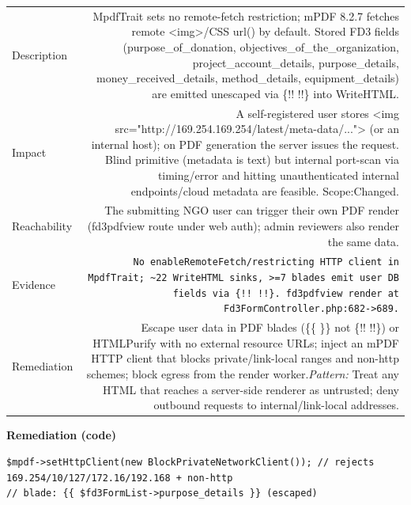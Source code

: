 \documentclass[11pt,a4paper]{article}
\begin{document}
{\renewcommand{\arraystretch}{1.35}%
\begin{tabularx}{\textwidth}{L R}
\toprule
Description & MpdfTrait sets no remote-fetch restriction; mPDF 8.2.7 fetches remote \textless{}img\textgreater{}/CSS url() by default. Stored FD3 fields (purpose\_of\_donation, objectives\_of\_the\_organization, project\_account\_details, purpose\_details, money\_received\_details, method\_details, equipment\_details) are emitted unescaped via \{!! !!\} into WriteHTML. \\
Impact & A self-registered user stores \textless{}img src="http://169.254.169.254/latest/meta-data/..."\textgreater{} (or an internal host); on PDF generation the server issues the request. Blind primitive (metadata is text) but internal port-scan via timing/error and hitting unauthenticated internal endpoints/cloud metadata are feasible. Scope:Changed. \\
Reachability & The submitting NGO user can trigger their own PDF render (fd3pdfview route under web auth); admin reviewers also render the same data. \\
Evidence & \texttt{\small No enableRemoteFetch/restricting HTTP client in MpdfTrait; \textasciitilde{}22 WriteHTML sinks, \textgreater{}=7 blades emit user DB fields via \{!! !!\}. fd3pdfview render at Fd3FormController.php:682-\textgreater{}689.} \\
Remediation & Escape user data in PDF blades (\{\{ \}\} not \{!! !!\}) or HTMLPurify with no external resource URLs; inject an mPDF HTTP client that blocks private/link-local ranges and non-http schemes; block egress from the render worker.\newline\emph{Pattern:} Treat any HTML that reaches a server-side renderer as untrusted; deny outbound requests to internal/link-local addresses. \\
\bottomrule
\end{tabularx}}

\vspace{4pt}\noindent\textbf{Remediation (code)}\par
\begin{lstlisting}
$mpdf->setHttpClient(new BlockPrivateNetworkClient()); // rejects 169.254/10/127/172.16/192.168 + non-http
// blade: {{ $fd3FormList->purpose_details }} (escaped)
\end{lstlisting}
\end{document}
